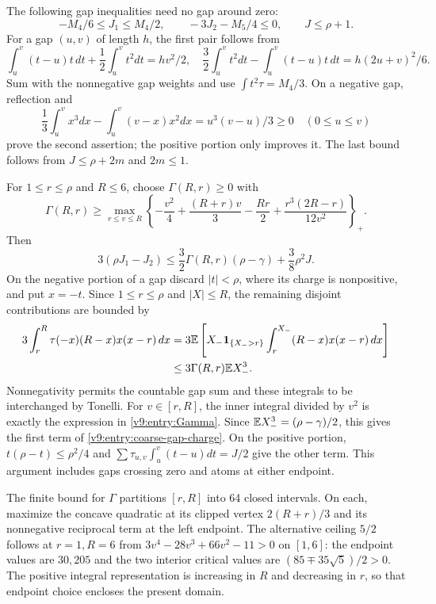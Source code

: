The following gap inequalities need no gap around zero:
\begin{equation}\label{v9:entry:gap-free}
 -M_4/6\le J_1\le M_4/2,\qquad -3J_2-M_5/4\le0,\qquad J\le\rho+1.
\end{equation}
For a gap $(u,v)$ of length $h$, the first pair follows from
\[
 \int_u^v(t-u)t\,dt+\frac12\int_u^vt^2dt=hv^2/2,
 \quad \frac32\int_u^vt^2dt-\int_u^v(t-u)t\,dt=h(2u+v)^2/6.
\]
Sum with the nonnegative gap weights and use $\int t^2\tau=M_4/3$.
On a negative gap, reflection and
\[
 \frac13\int_u^v x^3dx-\int_u^v(v-x)x^2dx=u^3(v-u)/3\ge0
 \quad(0\le u\le v)
\]
prove the second assertion; the positive portion only improves it.
The last bound follows from $J\le\rho+2m$ and $2m\le1$.

For $1\le r\le\rho$ and $R\le6$, choose $\Gamma(R,r)\ge0$ with
\begin{equation}\label{v9:entry:Gamma}
 \Gamma(R,r)\ge\max_{r\le v\le R}
 \left\{-\frac{v^2}4+\frac{(R+r)v}3-\frac{Rr}2
                  +\frac{r^3(2R-r)}{12v^2}\right\}_+.
\end{equation}
Then
\begin{equation}\label{v9:entry:coarse-gap-charge}
 3(\rho J_1-J_2)\le\frac32\Gamma(R,r)(\rho-\gamma)+\frac38\rho^2J.
\end{equation}
On the negative portion of a gap discard $|t|<\rho$, where its charge
is nonpositive, and put $x=-t$. Since $1\le r\le\rho$ and
$|X|\le R$, the remaining disjoint contributions are bounded by
\begin{align*}
 3\int_r^R\tau(-x)(R-x)x(x-r)\,dx
 &=3\mathbb E\left[X_-\mathbf1_{\{X_->r\}}
       \int_r^{X_-}(R-x)x(x-r)\,dx\right]\\
 &\le3\Gamma(R,r)\mathbb E X_-^3.
\end{align*}
Nonnegativity permits the countable gap sum and these integrals to be
interchanged by Tonelli. For $v\in[r,R]$, the inner integral divided
by $v^2$ is exactly the expression in \eqref{v9:entry:Gamma}.
Since $\mathbb E X_-^3=(\rho-\gamma)/2$, this gives the first term of
\eqref{v9:entry:coarse-gap-charge}. On the positive portion,
$t(\rho-t)\le\rho^2/4$ and
$\sum\tau_{u,v}\int_u^v(t-u)dt=J/2$ give the other term.
This argument includes gaps crossing zero and atoms at either endpoint.

The finite bound for $\Gamma$ partitions $[r,R]$ into 64 closed
intervals. On each, maximize the concave quadratic at its clipped vertex
$2(R+r)/3$ and its nonnegative reciprocal term at the left endpoint.
The alternative ceiling $5/2$ follows at $r=1,R=6$ from
$3v^4-28v^3+66v^2-11>0$ on $[1,6]$: the endpoint values are $30,205$
and the two interior critical values are $(85\mp35\sqrt5)/2>0$.
The positive integral representation is increasing in $R$ and decreasing
in $r$, so that endpoint choice encloses the present domain.

